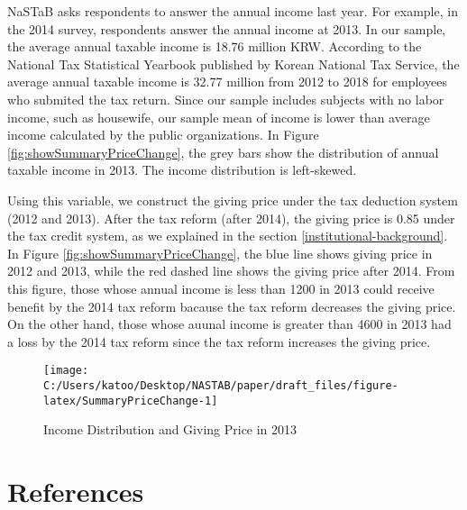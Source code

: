 \documentclass[
]{article}
\begin{document}
NaSTaB asks respondents to answer the annual income last year.
For example, in the 2014 survey, respondents answer the annual income at 2013.
In our sample, the average annual taxable income is 18.76 million KRW.
According to the National Tax Statistical Yearbook published by Korean National Tax Service,
the average annual taxable income is 32.77 million from 2012 to 2018
for employees who submited the tax return.
Since our sample includes subjects with no labor income, such as housewife,
our sample mean of income is lower than average income calculated by the public organizations.
In Figure \ref{fig:showSummaryPriceChange},
the grey bars show the distribution of annual taxable income in 2013.
The income distribution is left-skewed.

Using this variable, we construct the giving price under the tax deduction system (2012 and 2013).
After the tax reform (after 2014), the giving price is 0.85 under the tax credit system,
as we explained in the section \ref{institutional-background}.
In Figure \ref{fig:showSummaryPriceChange},
the blue line shows giving price in 2012 and 2013,
while the red dashed line shows the giving price after 2014.
From this figure,
those whose annual income is less than 1200 in 2013 could receive benefit by the 2014 tax reform
bacause the tax reform decreases the giving price.
On the other hand,
those whose auunal income is greater than 4600 in 2013 had a loss by the 2014 tax reform
since the tax reform increases the giving price.

\begin{figure}[t]

{\centering \texttt{[image: C:/Users/katoo/Desktop/NASTAB/paper/draft\_files/figure-latex/SummaryPriceChange-1]} 

}

\caption{Income Distribution and Giving Price in 2013}\label{fig:SummaryPriceChange}
\end{figure}

\clearpage

\hypertarget{references}{%
\section*{References}\label{references}}
\end{document}
